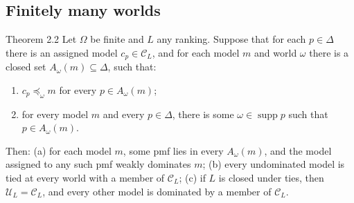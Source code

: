 \documentclass[11pt]{article}
\newcommand{\C}{\mathcal C}
\newcommand{\U}{\mathcal U}
\newcommand{\supp}{\operatorname{supp}}
\begin{document}
\subsection*{Finitely many worlds}
\begin{stmt}{Theorem 2.2}
Let $\Omega$ be finite and $L$ any ranking. Suppose that for each $p\in\Delta$ there is an assigned model $c_p\in\C_L$, and for each model $m$ and world $\omega$ there is a closed set $A_\omega(m)\subseteq\Delta$, such that:
\begin{enumerate}[label=(\roman*)]
\item $c_p\preceq_\omega m$ for every $p\in A_\omega(m)$;
\item for every model $m$ and every $p\in\Delta$, there is some $\omega\in\supp p$ such that $p\in A_\omega(m)$.
\end{enumerate}
Then: (a) for each model $m$, some pmf lies in every $A_\omega(m)$, and the model assigned to any such pmf weakly dominates $m$; (b) every undominated model is tied at every world with a member of $\C_L$; (c) if $L$ is closed under ties, then $\U_L=\C_L$, and every other model is dominated by a member of $\C_L$.
\end{stmt}
\end{document}
